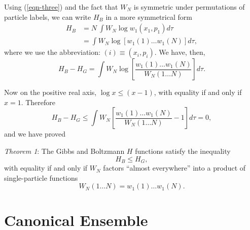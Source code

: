 \documentclass[twocolumn]{article}
\begin{document}
Using (\ref{eqn-three}) and the fact that $W_N$ is symmetric under permutations of particle labels, we can write $H_B$ in a more symmetrical form
%
\begin{align*}
H_{B} & = N\ \int W_{N}\log{w_{1}\left( x_{1},p_{1} \right){d\tau}} \\
& = \int W_{N}\log{\left\lbrack w_{1}\left( 1 \right)\ldots w_{1}\left( N \right) \right\rbrack{d\tau}},
\end{align*}
%
where we use the abbreviation: $(i) \equiv (x_i, p_i)$. We have, then,
%
\begin{equation}
H_{B} - H_{G} = \int W_{N}\log \left\lbrack \frac{w_{1}\left( 1 \right)\ldots w_{1}\left( N \right)}{W_{N}\left( 1\ldots N \right)} \right\rbrack d\tau. 
\label{eqn-four}
\end{equation}

Now on the positive real axis, $\log x \leq (x-1)$, with equality if and only if $x=1$. Therefore
\[
H_{B} - H_{G} \leq \int W_{N}\left\lbrack \frac{w_{1}\left( 1 \right)\ldots w_{1}\left( N \right)}{W_{N}\left( 1\ldots N \right)} - 1 \right\rbrack d\tau = 0,
\]
and we have proved

\emph{Theorem 1}: The Gibbs and Boltzmann $H$ functions satisfy the inequality
\begin{equation}
H_{B} \leq H_{G},
\label{eqn-five}
\end{equation}
with equality if and only if $W_N$ factors ``almost everywhere'' into a product of single-particle functions
\[
W_{N}\left( 1\ldots N \right) = w_{1}\left( 1 \right)\ldots w_{1}\left( N \right).
\]

\section{Canonical Ensemble}\label{sec-canonical-ensemble}
\end{document}
